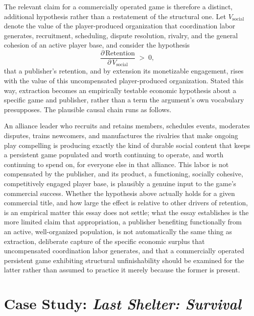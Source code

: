 \documentclass[11pt]{article}
\begin{document}
The relevant claim for a commercially operated game is therefore a distinct, additional hypothesis rather than a restatement of the structural one. Let $V_{\mathrm{social}}$ denote the value of the player-produced organization that coordination labor generates, recruitment, scheduling, dispute resolution, rivalry, and the general cohesion of an active player base, and consider the hypothesis
\[
\frac{\partial \, \mathrm{Retention}}{\partial \, V_{\mathrm{social}}} \;>\; 0,
\]
that a publisher's retention, and by extension its monetizable engagement, rises with the value of this uncompensated player-produced organization. Stated this way, extraction becomes an empirically testable economic hypothesis about a specific game and publisher, rather than a term the argument's own vocabulary presupposes. The plausible causal chain runs as follows.
\begin{center}
\end{center}
An alliance leader who recruits and retains members, schedules events, moderates disputes, trains newcomers, and manufactures the rivalries that make ongoing play compelling is producing exactly the kind of durable social content that keeps a persistent game populated and worth continuing to operate, and worth continuing to spend on, for everyone else in that alliance. This labor is not compensated by the publisher, and its product, a functioning, socially cohesive, competitively engaged player base, is plausibly a genuine input to the game's commercial success. Whether the hypothesis above actually holds for a given commercial title, and how large the effect is relative to other drivers of retention, is an empirical matter this essay does not settle; what the essay establishes is the more limited claim that appropriation, a publisher benefiting functionally from an active, well-organized population, is not automatically the same thing as extraction, deliberate capture of the specific economic surplus that uncompensated coordination labor generates, and that a commercially operated persistent game exhibiting structural unfinishability should be examined for the latter rather than assumed to practice it merely because the former is present.

\section{Case Study: \emph{Last Shelter: Survival}}
\end{document}
